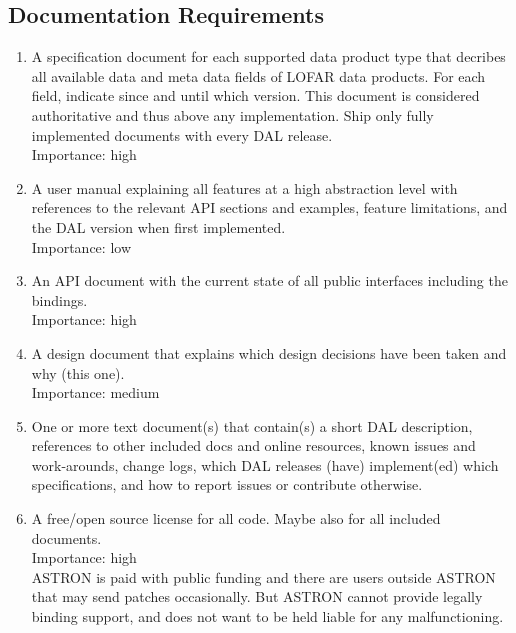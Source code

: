\documentclass[a4paper,11pt]{article}
\begin{document}
\subsection{Documentation Requirements} \label{sec:doc_reqs}
\begin{enumerate}[resume, label=\it R.\arabic{*}]
\itemsep0em

\item \label{req:doc_spec} A specification document for each supported data product type that decribes all available data and meta data fields of LOFAR data products. For each field, indicate since and until which version. This document is considered authoritative and thus above any implementation. Ship only fully implemented documents with every DAL release.\\
Importance: high\\

\item \label{req:doc_user_manual} A user manual explaining all features at a high abstraction level with references to the relevant API sections and examples, feature limitations, and the DAL version when first implemented.\\
Importance: low\\

\item \label{req:doc_api} An API document with the current state of all public interfaces including the bindings.\\
Importance: high\\

\item \label{req:doc_design_decisions} A design document that explains which design decisions have been taken and why (this one).\\
Importance: medium\\

\item \label{req:doc_misc} One or more text document(s) that contain(s) a short DAL description, references to other included docs and online resources, known issues and work-arounds, change logs, which DAL releases (have) implement(ed) which specifications, and how to report issues or contribute otherwise.

\item \label{req:doc_license} A free/open source license for all code. Maybe also for all included documents.\\
Importance: high\\
ASTRON is paid with public funding and there are users outside ASTRON that may send patches occasionally.
But ASTRON cannot provide legally binding support, and does not want to be held liable for any malfunctioning.

\end{enumerate}
\end{document}
